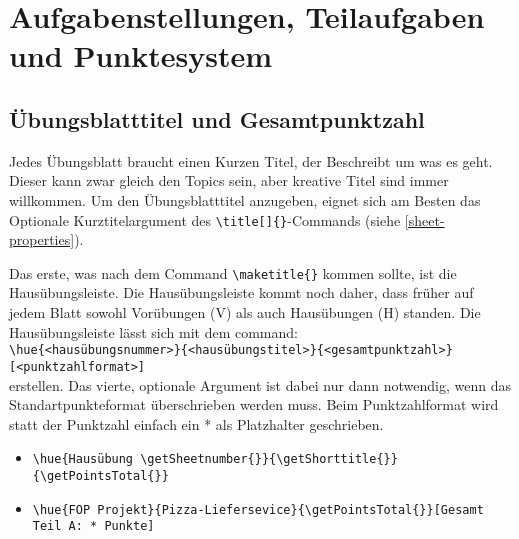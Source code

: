 \documentclass[
    titleprefix=AlgoTeX,
    inlineshortcut=java,
    corporatedesign,
    boxarc,
]{algoexercise}
\begin{document}
    \section{Aufgabenstellungen, Teilaufgaben und Punktesystem}\label{Exercises}
    \vspace{-1em}
    \subsection{Übungsblatttitel und Gesamtpunktzahl}\label{totalpoints_and_sheet_title}
    \vspace{-1em}
    Jedes Übungsblatt braucht einen Kurzen Titel, der Beschreibt um was es geht.
    Dieser kann zwar gleich den Topics sein, aber kreative Titel sind immer willkommen.
    Um den Übungsblatttitel anzugeben, eignet sich am Besten das Optionale Kurztitelargument des \verb+\title[]{}+-Commands (siehe
    \ref{sheet-properties}).

    Das erste, was nach dem Command \verb+\maketitle{}+ kommen sollte, ist die Hausübungsleiste.
    Die Hausübungsleiste kommt noch daher, dass früher auf jedem Blatt sowohl Vorübungen (V) als auch Hausübungen (H) standen.
    Die Hausübungsleiste lässt sich mit dem command:\\
    \verb+\hue{<hausübungsnummer>}{<hausübungstitel>}{<gesamtpunktzahl>}[<punktzahlformat>]+\\
    erstellen.
    Das vierte, optionale Argument ist dabei nur dann notwendig, wenn das Standartpunkteformat überschrieben werden muss.
    Beim Punktzahlformat wird statt der Punktzahl einfach ein * als Platzhalter geschrieben.

    \begin{beispiele}
        \begin{itemize}
            \item\verb+\hue{Hausübung \getSheetnumber{}}{\getShorttitle{}}{\getPointsTotal{}}+
            \item\verb+\hue{FOP Projekt}{Pizza-Liefersevice}{\getPointsTotal{}}[Gesamt Teil A: * Punkte]+%
        \end{itemize}
    \end{beispiele}
    \vspace{-1em}
\end{document}
